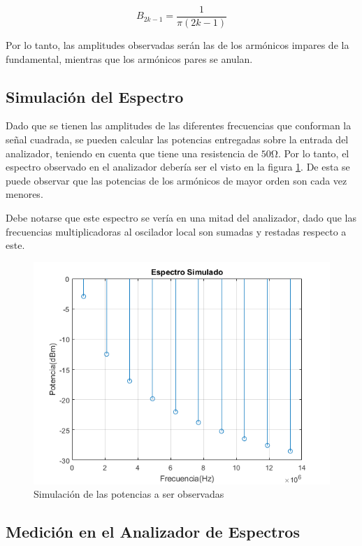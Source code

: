     \begin{equation}
        B_{2k-1} =\frac{1}{\pi (2k-1)}
    \end{equation}

    Por lo tanto, las amplitudes observadas serán las de los armónicos
    impares de la fundamental, mientras que los armónicos pares se anulan.
    
    \subsection{Simulación del Espectro}
    Dado que se tienen las amplitudes de las diferentes frecuencias que
    conforman la señal cuadrada, se pueden calcular las potencias entregadas
    sobre la entrada del analizador, teniendo en cuenta que tiene una
    resistencia de $50\si{\ohm}$.
    Por lo tanto, el espectro observado en el analizador debería ser el visto en la figura
    \ref{fig:2,1,2}. De esta se puede observar que las potencias de los
    armónicos de mayor orden son cada vez menores.

    Debe notarse que este espectro se vería en una mitad del analizador,
    dado que las frecuencias multiplicadoras al oscilador local son sumadas
    y restadas respecto a este.

    \begin{figure}[ht]
        \begin{center}
            \includegraphics[width=0.75\linewidth]{contenido/img/spect_sqr.png}
            \caption{Simulación de las potencias a ser observadas}
            \label{fig:2,1,2}
        \end{center}
    \end{figure}

    \subsection{Medición en el Analizador de Espectros}

